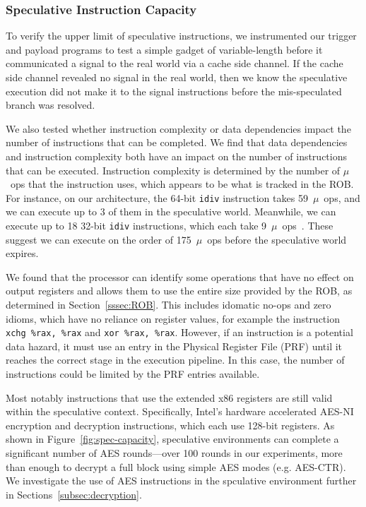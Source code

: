 
\subsubsection{Speculative Instruction Capacity}

To verify the upper limit of speculative instructions, we instrumented our
trigger and payload programs to test a simple gadget of variable-length before it
communicated a signal to the real world via a cache side channel. If the cache
side channel revealed no signal in the real world, then we know the speculative
execution did not make it to the signal instructions before the mis-speculated
branch was resolved.

We also tested whether instruction complexity or data dependencies impact the
number of instructions that can be completed. We find that data dependencies and
instruction complexity both have an impact on the number of instructions that
can be executed. Instruction complexity is determined by the number of $\mu$~ops
that the instruction uses, which appears to be what is tracked in the ROB. For
instance, on our architecture, the 64-bit \texttt{idiv} instruction takes 59~$\mu$~ops,
and we can execute up to 3 of them in the speculative world.
Meanwhile, we can execute up to 18 32-bit \texttt{idiv} instructions, which each
take 9~$\mu$~ops~\cite{intel-instruction-tables}. These suggest we can execute
on the order of 175~$\mu$~ops before the speculative world expires.

We found that the processor can identify some operations that have no effect on
output registers and allows them to use the entire size provided by the ROB, as
determined in Section~\ref{sssec:ROB}. This includes idomatic no-ops and zero
idioms, which have no reliance on register values, for example the instruction
\texttt{xchg \%rax, \%rax} and \texttt{xor \%rax, \%rax}. However, if an
instruction is a potential data hazard, it must use an entry in the Physical 
Register File (PRF) until it reaches the correct stage in the execution pipeline. 
In this case, the number of instructions could be limited by the PRF
entries available.


Most notably instructions that use the extended x86 registers are still valid
within the speculative context. Specifically, Intel's hardware accelerated
AES-NI encryption and decryption instructions, which each use 128-bit registers.
As shown in Figure~\ref{fig:spec-capacity}, speculative environments can
complete a significant number of AES rounds---over 100 rounds in our
experiments, more than enough to decrypt a
full block using simple AES modes (e.g. AES-CTR). We investigate the use of AES
instructions in the spculative environment further in
Sections~\ref{subsec:decryption}.

